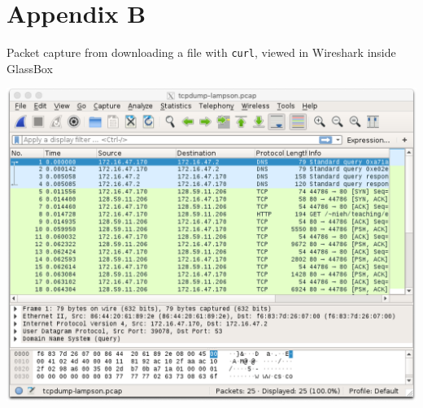 \documentclass{proc}
\begin{document}
\section*{Appendix B}
\begin{minipage}[t]{\textwidth}
Packet capture from downloading a file with \texttt{curl}, viewed in Wireshark inside GlassBox 
\end{minipage}
\includegraphics[scale=0.7]{wshark}
\clearpage
\end{document}
